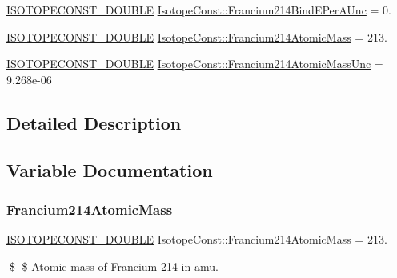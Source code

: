 \begin{DoxyCompactItemize}
\mbox{\hyperlink{group___isotope_const-_macros_ga8f45a7272ce02c0b4c65c44636ed719a}{I\+S\+O\+T\+O\+P\+E\+C\+O\+N\+S\+T\+\_\+\+D\+O\+U\+B\+LE}} \mbox{\hyperlink{group___isotope_const-_francium-_fr214_ga5c2b278178ae6daa0d822bcfce3b8b10}{Isotope\+Const\+::\+Francium214\+Bind\+E\+Per\+A\+Unc}} = 0.
\item 
\mbox{\hyperlink{group___isotope_const-_macros_ga8f45a7272ce02c0b4c65c44636ed719a}{I\+S\+O\+T\+O\+P\+E\+C\+O\+N\+S\+T\+\_\+\+D\+O\+U\+B\+LE}} \mbox{\hyperlink{group___isotope_const-_francium-_fr214_gad10248685498ad69eafdf1e174b3a56c}{Isotope\+Const\+::\+Francium214\+Atomic\+Mass}} = 213.
\item 
\mbox{\hyperlink{group___isotope_const-_macros_ga8f45a7272ce02c0b4c65c44636ed719a}{I\+S\+O\+T\+O\+P\+E\+C\+O\+N\+S\+T\+\_\+\+D\+O\+U\+B\+LE}} \mbox{\hyperlink{group___isotope_const-_francium-_fr214_ga4efe26b483843af85af6956252485243}{Isotope\+Const\+::\+Francium214\+Atomic\+Mass\+Unc}} = 9.\+268e-\/06
\end{DoxyCompactItemize}


\subsection{Detailed Description}


\subsection{Variable Documentation}
\mbox{\label{group___isotope_const-_francium-_fr214_gad10248685498ad69eafdf1e174b3a56c}} 
\subsubsection{\texorpdfstring{Francium214\+Atomic\+Mass}{Francium214AtomicMass}}
{\footnotesize\ttfamily \mbox{\hyperlink{group___isotope_const-_macros_ga8f45a7272ce02c0b4c65c44636ed719a}{I\+S\+O\+T\+O\+P\+E\+C\+O\+N\+S\+T\+\_\+\+D\+O\+U\+B\+LE}} Isotope\+Const\+::\+Francium214\+Atomic\+Mass = 213.}

\$ \$ Atomic mass of Francium-\/214 in amu. \mbox{\label{group___isotope_const-_francium-_fr214_ga4efe26b483843af85af6956252485243}} 
